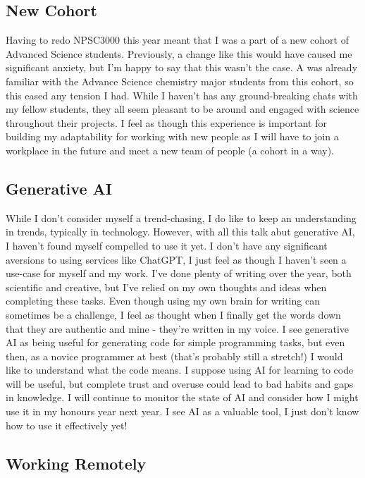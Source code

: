 \documentclass[11pt]{article}
\begin{document}
\subsection{New Cohort}

Having to redo NPSC3000 this year meant that I was a part of a new cohort of Advanced Science students. Previously, a change like this would have caused me significant anxiety, but I'm happy to say that this wasn't the case. A was already familiar with the Advance Science chemistry major students from this cohort, so this eased any tension I had. While I haven't has any ground-breaking chats with my fellow students, they all seem pleasant to be around and engaged with science throughout their projects. I feel as though this experience is important for building my adaptability for working with new people as I will have to join a workplace in the future and meet a new team of people (a cohort in a way).

\subsection{Generative AI}

While I don't consider myself a trend-chasing, I do like to keep an understanding in trends, typically in technology. However, with all this talk abut generative AI, I haven't found myself compelled to use it yet. I don't have any significant aversions to using services like ChatGPT, I just feel as though I haven't seen a use-case for myself and my work. I've done plenty of writing over the year, both scientific and creative, but I've relied on my own thoughts and ideas when completing these tasks. Even though using my own brain for writing can sometimes be a challenge, I feel as thought when I finally get the words down that they are authentic and mine - they're written in my voice. I see generative AI as being useful for generating code for simple programming tasks, but even then, as a novice programmer at best (that's probably still a stretch!) I would like to understand what the code means. I suppose using AI for learning to code will be useful, but complete trust and overuse could lead to bad habits and gaps in knowledge. I will continue to monitor the state of AI and consider how I might use it in my honours year next year. I see AI as a valuable tool, I just don't know how to use it effectively yet!

\subsection{Working Remotely}
\end{document}
